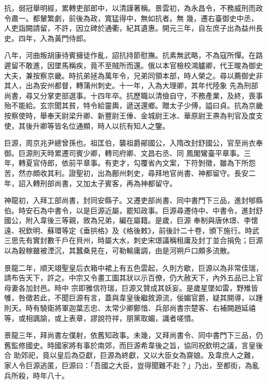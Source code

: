 \begin{pinyinscope}
 抗，弱冠舉明經，累轉吏部郎中，以清謹著稱。景雲初，為永昌令，不務威刑而政令肅一。都輦繁劇，前後為政，寬猛得中，無如抗者。無
 幾，遷右臺御史中丞，人吏詣闕請留，不許，因立碑於通衢，紀其遺惠。開元三年，自左庶子出為益州長史。四年，入為黃門侍郎。



 八年，河曲叛胡康待賓擁徒作亂，詔抗持節慰撫。抗素無武略，不為寇所憚。在路遲留不敢進，因墜馬稱疾，竟不至賊所而還。俄以本官檢校鴻臚卿，代王晙為御史大夫，兼按察京畿。時抗弟拯為萬年令，兄弟同領本部，時人榮之。尋以薦御史非其人，出為安州都督，轉蒲州刺史。十一年，入為大理卿，其年代陸象
 先為刑部尚書，尋又分掌吏部選事。十四年卒。抗歷職以清儉自守，不務產業，及終，喪事殆不能給。玄宗聞其貧，特令給靈輿，遞送還鄉。贈太子少傅，謚曰貞。抗為京畿按察使時，舉奉天尉梁升卿、新豐尉王倕、金城尉王冰、華原尉王燾為判官及度支使，其後升卿等皆名位通顯，時人以抗有知人之鑒。



 巨源，周京兆尹總曾孫也。祖匡伯，襲祖爵鄖國公，入隋改封舒國公，官至尚衣奉御。巨源則天時累遷司賓少卿，轉司府卿、文昌右丞、同
 鳳閣鸞臺平章事。三年，轉夏官侍郎，依前平章事。有吏才，勾覆省內文案，下符剝徵，雖為下所怨苦，然亦頗收其利。證聖初，出為鄜州刺史，尋拜地官尚書、神都留守。長安二年，詔入轉刑部尚書，又加太子賓客，再為神都留守。



 神龍初，入拜工部尚書，封同安縣子。又遷吏部尚書、同中書門下三品，進封郇縣伯。時安石為中書令，以是巨源近屬，罷知政事。巨源尋遷侍中、中書令，進封舒國公，附入韋後三等親，敘為兄弟，編在屬籍。是歲，巨源
 奉制與唐休璟、李懷遠、祝欽明、蘇環等定《垂拱格》及《格後敕》，前後計二十卷，頒下施行。時武三思先有實封數千戶在貝州，時屬大水，刺史宋璟議稱租庸及封丁並合捐免；巨源以為穀稼雖被湮沉，其蠶桑見在，可勒輸庸調，由是河朔戶口頗多流散。



 景龍二年，順天翊聖皇后衣箱中裙上有五色雲起，久則方歇，巨源以為非常佳瑞，請布告天下，許之。中宗又令畫工圖其狀以示百僚，仍大赦天下，內外五品已上官母妻各加封邑。時中
 宗即雅信符瑞，巨源又贊成其妖妄。是歲星墜如雷，野雉皆雊，咎徵若此，不聞巨源有言，蓋與韋皇後繼敘源流，佞媚官爵，疑其開導，以踵則天。時有驍衛將軍迦葉志忠、太常少卿鄭愔、兵部尚書宗楚客、右補闕趙延禧等，或相諷諭，或上表章，謬說符祥，朋黨取媚，識者嗟憤。



 景龍三年，拜尚書左僕射，依舊知政事。未幾，又拜尚書令、同中書門下三品，仍舊監修國史。時國家將有事於南郊，而巨源希韋後之旨，協同祝欽明之議，言皇後合
 助郊祀，竟以皇后為亞獻，巨源為終獻，又以大臣女為齋娘。及韋庶人之難，家人令巨源逃匿，巨源曰：「吾國之大臣，豈得聞難不赴？」乃出，至都街，為亂兵所殺，時年八十。




\end{pinyinscope}
